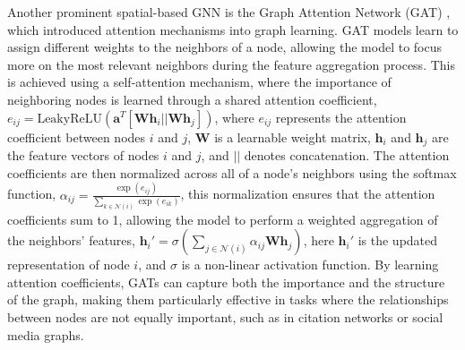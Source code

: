 Another prominent spatial-based GNN is the Graph Attention Network
(GAT) \cite{velickovic2017graph}, which introduced attention
mechanisms into graph learning. GAT models learn to assign different
weights to the neighbors of a node, allowing the model to focus more
on the most relevant neighbors during the feature aggregation
process. This is achieved using a self-attention mechanism, where the
importance of neighboring nodes is learned through a shared attention
coefficient, $ e_{ij} = \text{LeakyReLU}(\mathbf{a}^T [\mathbf{W}
\mathbf{h}_i || \mathbf{W} \mathbf{h}_j]) $, where $e_{ij}$ represents
the attention coefficient between nodes $i$ and $j$, $\mathbf{W}$ is a
learnable weight matrix, $\mathbf{h}_i$ and $\mathbf{h}_j$ are the
feature vectors of nodes $i$ and $j$, and $||$ denotes
concatenation. The attention coefficients are then normalized across
all of a node's neighbors using the softmax function, $ \alpha_{ij} =
\frac{\exp(e_{ij})}{\sum_{k \in \mathcal{N}(i)} \exp(e_{ik})} $, this normalization
ensures that the attention coefficients sum to 1, allowing the model
to perform a weighted aggregation of the neighbors' features, $
\mathbf{h}_i' = \sigma \left( \sum_{j \in \mathcal{N}(i)} \alpha_{ij} \mathbf{W} \mathbf{h}_j
\right)$, here $\mathbf{h}_i'$ is the updated representation of node
$i$, and $\sigma$ is a non-linear activation function. By learning
attention coefficients, GATs can capture both the importance and the
structure of the graph, making them particularly effective in tasks
where the relationships between nodes are not equally important, such
as in citation networks or social media graphs.
